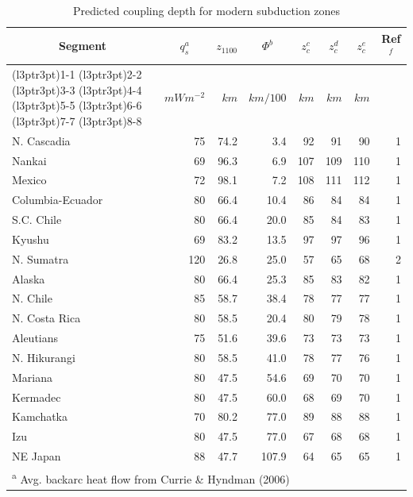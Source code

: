 \documentclass[draft,linenumbers]{agujournal2018}
\begin{document}
\begin{table}

\caption{\label{tab:segs}Predicted coupling depth for modern subduction zones}
\centering
\fontsize{8}{10}\selectfont
\begin{tabular}[t]{lrrrrrrr}
\toprule
\multicolumn{1}{c}{Segment} & \multicolumn{1}{c}{$q_s^a$} & \multicolumn{1}{c}{$z_{1100}$} & \multicolumn{1}{c}{$\Phi^b$} & \multicolumn{1}{c}{$z_c^c$} & \multicolumn{1}{c}{$z_c^d$} & \multicolumn{1}{c}{$z_c^e$} & \multicolumn{1}{c}{Ref$^f$} \\
\cmidrule(l{3pt}r{3pt}){1-1} \cmidrule(l{3pt}r{3pt}){2-2} \cmidrule(l{3pt}r{3pt}){3-3} \cmidrule(l{3pt}r{3pt}){4-4} \cmidrule(l{3pt}r{3pt}){5-5} \cmidrule(l{3pt}r{3pt}){6-6} \cmidrule(l{3pt}r{3pt}){7-7} \cmidrule(l{3pt}r{3pt}){8-8}
 & $mWm^{-2}$ & $km$ & $km/100$ & $km$ & $km$ & $km$ & \\
\midrule
N. Cascadia & 75 & 74.2 & 3.4 & 92 & 91 & 90 & 1\\
Nankai & 69 & 96.3 & 6.9 & 107 & 109 & 110 & 1\\
Mexico & 72 & 98.1 & 7.2 & 108 & 111 & 112 & 1\\
Columbia-Ecuador & 80 & 66.4 & 10.4 & 86 & 84 & 84 & 1\\
S.C. Chile & 80 & 66.4 & 20.0 & 85 & 84 & 83 & 1\\
\addlinespace
Kyushu & 69 & 83.2 & 13.5 & 97 & 97 & 96 & 1\\
N. Sumatra & 120 & 26.8 & 25.0 & 57 & 65 & 68 & 2\\
Alaska & 80 & 66.4 & 25.3 & 85 & 83 & 82 & 1\\
N. Chile & 85 & 58.7 & 38.4 & 78 & 77 & 77 & 1\\
N. Costa Rica & 80 & 58.5 & 20.4 & 80 & 79 & 78 & 1\\
\addlinespace
Aleutians & 75 & 51.6 & 39.6 & 73 & 73 & 73 & 1\\
N. Hikurangi & 80 & 58.5 & 41.0 & 78 & 77 & 76 & 1\\
Mariana & 80 & 47.5 & 54.6 & 69 & 70 & 70 & 1\\
Kermadec & 80 & 47.5 & 60.0 & 68 & 69 & 70 & 1\\
Kamchatka & 70 & 80.2 & 77.0 & 89 & 88 & 88 & 1\\
\addlinespace
Izu & 80 & 47.5 & 77.0 & 67 & 68 & 68 & 1\\
NE Japan & 88 & 47.7 & 107.9 & 64 & 65 & 65 & 1\\
\bottomrule
\multicolumn{8}{l}{\rule{0pt}{1em}\textsuperscript{a} Avg. backarc heat flow from Currie \& Hyndman (2006)}\\

\end{tabular}
\end{table}
\end{document}
